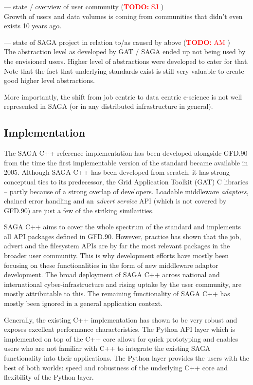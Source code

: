 \documentclass{article}
\newcommand{\B}[1]{\textbf{#1}}
\newcommand{\todo}[1]{{\textcolor{red}{\B{TODO:} #1 }}}
\begin{document}
 --- state / overview of user community (\todo{SJ})\\
 Growth of users and data volumes is coming from communities that
 didn't even exists 10 years ago.
 
 
 --- state of SAGA project in relation to/as caused by above (\todo{AM})\\
 
 The abstraction level as developed by GAT / SAGA ended up not being
 used by the envisioned users.  Higher level of abstractions were
 developed to cater for that. Note that the fact that underlying
 standards exist is still very valuable to create good higher level
 abstractions.

 More importantly, the shift from job centric to data centric
 e-science is not well represented in SAGA (or in any distributed
 infrastructure in general).

\subsection{Implementation}

The SAGA C++ reference implementation has been developed alongside
GFD.90 from the time the first implementable version of the standard
became available in 2005. Although SAGA C++ has been developed from
scratch, it has strong conceptual ties to its predecessor, the Grid
Application Toolkit (GAT) C libraries -- partly because of a strong
overlap of developers.  Loadable middleware \textit{adaptors}, chained
error handling and an \textit{advert service} API (which is not
covered by GFD.90) are just a few of the striking similarities.

SAGA C++ aims to cover the whole spectrum of the standard and
implements all API packages defined in GFD.90. However, practice has
shown that the job, advert and the filesystem APIs are by far the most
relevant packages in the broader user community.  This is why
development efforts have mostly been focusing on these functionalities
in the form of new middleware adaptor development. The broad
deployment of SAGA C++ across national and international
cyber-infrastructure and rising uptake by the user community, are
mostly attributable to this. The remaining functionality of SAGA C++
has mostly been ignored in a general application context.

Generally, the existing C++ implementation has shown to be very robust
and exposes excellent performance characteristics. The Python API
layer which is implemented on top of the C++ core allows for quick
prototyping and enables users who are not familiar with C++ to
integrate the existing SAGA functionality into their applications. The
Python layer provides the users with the best of both worlds: speed
and robustness of the underlying C++ core and flexibility of the
Python layer.
\end{document}
